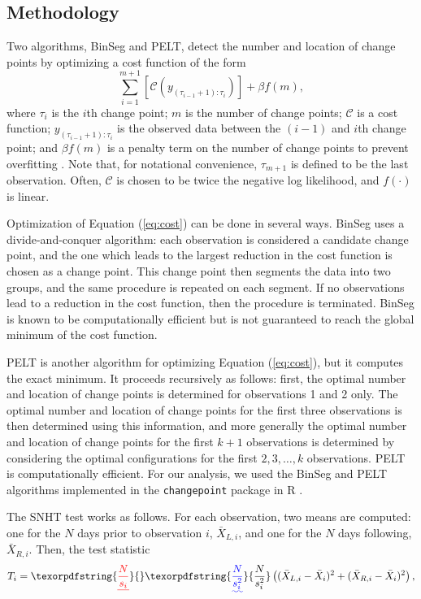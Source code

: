\documentclass[12pt]{article}
\providecommand{\DIFaddtex}[1]{{\protect\color{blue}\uwave{#1}}} %
\providecommand{\DIFdeltex}[1]{{\protect\color{red}\sout{#1}}}                      %
\providecommand{\DIFaddbegin}{} %
\providecommand{\DIFaddend}{} %
\providecommand{\DIFdelbegin}{} %
\providecommand{\DIFdelend}{} %
\providecommand{\DIFadd}[1]{\texorpdfstring{\DIFaddtex{#1}}{#1}} %
\providecommand{\DIFdel}[1]{\texorpdfstring{\DIFdeltex{#1}}{}} %
\begin{document}
\begin{doublespacing}
\subsection{Methodology}
\label{ssec:methodology}

Two algorithms, BinSeg and PELT, detect the number and location of change points by optimizing a cost function of the form
\begin{equation}
	\sum_{i=1}^{m+1} [\mathcal{C}(y_{(\tau_{i-1}+1):\tau_i})] + \beta f(m),
	\label{eq:cost}
\end{equation}
where $\tau_i$ is the $i$th change point; $m$ is the number of change points; $\mathcal{C}$ is a cost function; $y_{(\tau_{i-1}+1):\tau_i}$ is the observed data between the $(i-1)$ and $i$th change point; and $\beta f(m)$ is a penalty term on the number of change points to prevent overfitting \cite{killick12}.  Note that, for notational convenience, $\tau_{m+1}$ is defined to be the last observation.  Often, $\mathcal{C}$ is chosen to be twice the negative log likelihood, and $f(\cdot)$ is linear.

Optimization of Equation (\ref{eq:cost}) can be done in several ways.  BinSeg uses a divide-and-conquer algorithm: each observation is considered a candidate change point, and the one which leads to the largest reduction in the cost function is chosen as a change point.  This change point then segments the data into two groups, and the same procedure is repeated on each segment.  If no observations lead to a reduction in the cost function, then the procedure is terminated.  BinSeg is known to be computationally efficient but is not guaranteed to reach the global minimum of the cost function.

PELT is another algorithm for optimizing Equation (\ref{eq:cost}), but it computes the exact minimum.  It proceeds recursively as follows: first, the optimal number and location of change points is determined for observations 1 and 2 only.  The optimal number and location of change points for the first three observations is then determined using this information, and more generally the optimal number and location of change points for the first $k+1$ observations is determined by considering the optimal configurations for the first $2, 3, \ldots, k$ observations.  PELT is computationally efficient.  For our analysis, we used the BinSeg and PELT algorithms implemented in the \texttt{changepoint} package in R \cite{killick14}.

The SNHT test works as follows.  For each observation, two means are computed: one for the $N$ days prior to observation $i$, $\bar{X}_{L,i}$, and one for the $N$ days following, $\bar{X}_{R,i}$.  Then, the test statistic
\begin{equation}
	T_i = \DIFdelbegin \DIFdel{\frac{N}{s_i}}\DIFdelend \DIFaddbegin \DIFadd{\frac{N}{s_i^2}}\DIFaddend \left( (\bar{X}_{L,i}-\bar{X}_i)^2 + (\bar{X}_{R,i}-\bar{X}_i)^2\right),
	\label{eq:Hom}
\end{equation}
\DIFaddbegin 


\end{doublespacing}
\end{document}
